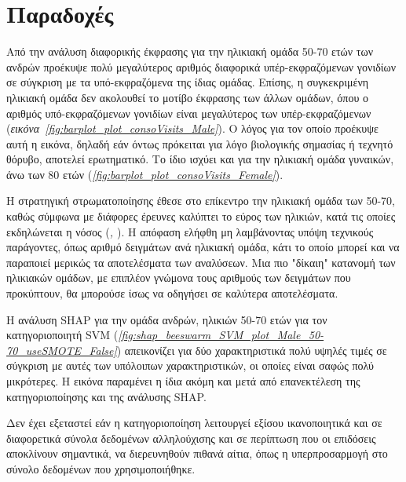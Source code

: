 \documentclass[12pt]{report}
\begin{document}
        \section{Παραδοχές}
            Από την ανάλυση διαφορικής έκφρασης για την ηλικιακή ομάδα 50-70 ετών των ανδρών προέκυψε πολύ μεγαλύτερος αριθμός διαφορικά υπέρ-εκφραζόμενων γονιδίων σε σύγκριση με τα υπό-εκφραζόμενα της ίδιας ομάδας. Επίσης, η συγκεκριμένη ηλικιακή ομάδα δεν ακολουθεί το μοτίβο έκφρασης των άλλων ομάδων, όπου ο αριθμός υπό-εκφραζόμενων γονιδίων είναι μεγαλύτερος των υπέρ-εκφραζόμενων (\emph{εικόνα~\ref{fig:barplot_plot_consoVisits_Male}}). Ο λόγος για τον οποίο προέκυψε αυτή η εικόνα, δηλαδή εάν όντως πρόκειται για λόγο βιολογικής σημασίας ή τεχνητό θόρυβο, αποτελεί ερωτηματικό. Το ίδιο ισχύει και για την ηλικιακή ομάδα γυναικών, άνω των 80 ετών (\emph{\ref{fig:barplot_plot_consoVisits_Female}}).
            \par
            Η στρατηγική στρωματοποίησης έθεσε στο επίκεντρο την ηλικιακή ομάδα των 50-70, καθώς σύμφωνα με διάφορες έρευνες καλύπτει το εύρος των ηλικιών, κατά τις οποίες εκδηλώνεται η νόσος (\emph{\cite{Bloem2021ParkinsonsDisease}, \cite{Wirdefeldt2011EpidemiologyEvidence}}). Η απόφαση ελήφθη μη λαμβάνοντας υπόψη τεχνικούς παράγοντες, όπως αριθμό δειγμάτων ανά ηλικιακή ομάδα, κάτι το οποίο μπορεί και να παραποιεί μερικώς τα αποτελέσματα των αναλύσεων. Μια πιο "δίκαιη" κατανομή των ηλικιακών ομάδων, με επιπλέον γνώμονα τους αριθμούς των δειγμάτων που προκύπτουν, θα μπορούσε ίσως να οδηγήσει σε καλύτερα αποτελέσματα.
            \par
            Η ανάλυση SHAP για την ομάδα ανδρών, ηλικιών 50-70 ετών για τον κατηγοριοποιητή SVM (\emph{\ref{fig:shap_beeswarm_SVM_plot_Male_50-70_useSMOTE_False}}) απεικονίζει για δύο χαρακτηριστικά πολύ υψηλές τιμές σε σύγκριση με αυτές των υπόλοιπων χαρακτηριστικών, οι οποίες είναι σαφώς πολύ μικρότερες. Η εικόνα παραμένει η ίδια ακόμη και μετά από επανεκτέλεση της κατηγοριοποίησης και της ανάλυσης SHAP.
            \par
            Δεν έχει εξεταστεί εάν η κατηγοριοποίηση λειτουργεί εξίσου ικανοποιητικά και σε διαφορετικά σύνολα δεδομένων αλληλούχισης και σε περίπτωση που οι επιδόσεις αποκλίνουν σημαντικά, να διερευνηθούν πιθανά αίτια, όπως η υπερπροσαρμογή στο σύνολο δεδομένων που χρησιμοποιήθηκε.
            
\end{document}
